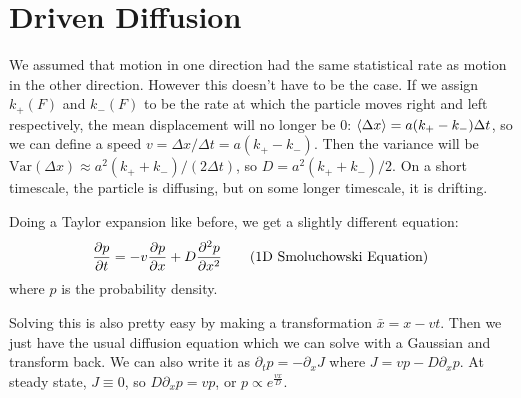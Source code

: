 \documentclass[a4paper,twoside,master.tex]{subfiles}
\begin{document}
\section{Driven Diffusion}\label{sec:driven_diffusion}

We assumed that motion in one direction had the same statistical rate as motion in the other direction. However this doesn't have to be the case. If we assign $ k_+(F) $ and $ k_-(F) $ to be the rate at which the particle moves right and left respectively, the mean displacement will no longer be $ 0 $: $ \ev{\Delta x} = a(k_+ - k_-) \Delta t $, so we can define a speed $ v = \Delta x / \Delta t = a(k_+ - k_-) $. Then the variance will be $ \text{Var}(\Delta x) \approx a^2 (k_+ + k_-)/(2 \Delta t) $, so $ D = a^2 (k_+ + k_-)/2 $. On a short timescale, the particle is diffusing, but on some longer timescale, it is drifting.

Doing a Taylor expansion like before, we get a slightly different equation:
\begin{equation}
    \pdv{p}{t} = -v \pdv{p}{x} + D \pdv[2]{p}{x} \tag{1D Smoluchowski Equation}
\end{equation}
where $ p $ is the probability density.

Solving this is also pretty easy by making a transformation $ \bar{x} = x - vt $. Then we just have the usual diffusion equation which we can solve with a Gaussian and transform back. We can also write it as $ \partial_t p = - \partial_x J $ where $ J = vp - D \partial_x p $. At steady state, $ J \equiv 0 $, so $ D \partial_x p = v p $, or $ p \propto e^{\frac{vx}{D}} $.
\end{document}
